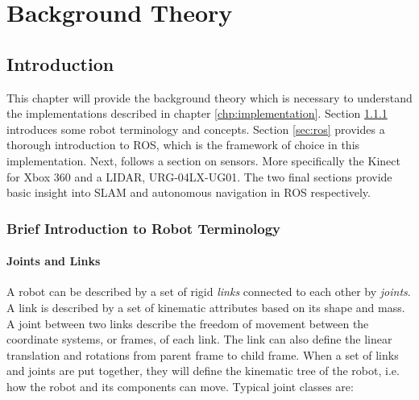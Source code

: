 \chapter{Background Theory}
\label{chp:theory} 

\section{Introduction}

This chapter will provide the background theory which is necessary to understand the implementations described in chapter \ref{chp:implementation}. Section \ref{sec:terminology} introduces some robot terminology and concepts. Section \ref{sec:ros} provides a thorough introduction to \ac{ROS}, which is the framework of choice in this implementation. Next, follows a section on sensors. More specifically the Kinect for Xbox 360 and a \ac{LIDAR}, URG-04LX-UG01. The two final sections provide basic insight into \ac{SLAM} and autonomous navigation in \ac{ROS} respectively. 

\subsection{Brief Introduction to Robot Terminology}
\label{sec:terminology}

\subsubsection{Joints and Links}

A robot can be described by a set of rigid \textit{links} connected to each other by \textit{joints}. A link is described by a set of kinematic attributes based on its shape and mass. A joint between two links describe the freedom of movement between the coordinate systems, or frames, of each link. The link can also define the linear translation and rotations from parent frame to child frame. When a set of links and joints are put together, they will define the kinematic tree of the robot, i.e. how the robot and its components can move. Typical joint classes are:


